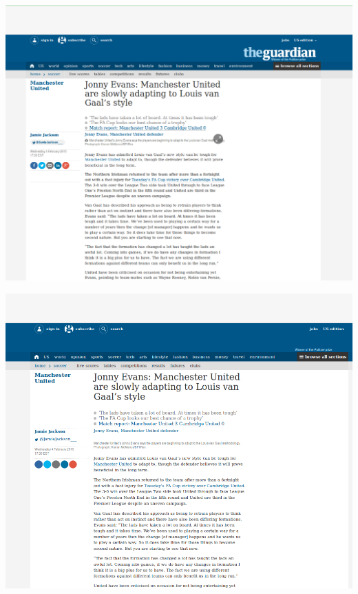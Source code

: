 \begin{minipage}{\linewidth}
	\includegraphics[scale=0.55]{figures/playback/webrecorder_89_webrecorder.PNG}
	\label{webrecorder_89_webrecorder}
\end{minipage}
\newpage
\begin{minipage}{\linewidth}
	\includegraphics[scale=0.55]{figures/playback/webrecorder_89_wget.PNG}
	\label{webrecorder_89_wget}
\end{minipage}
\newpage

